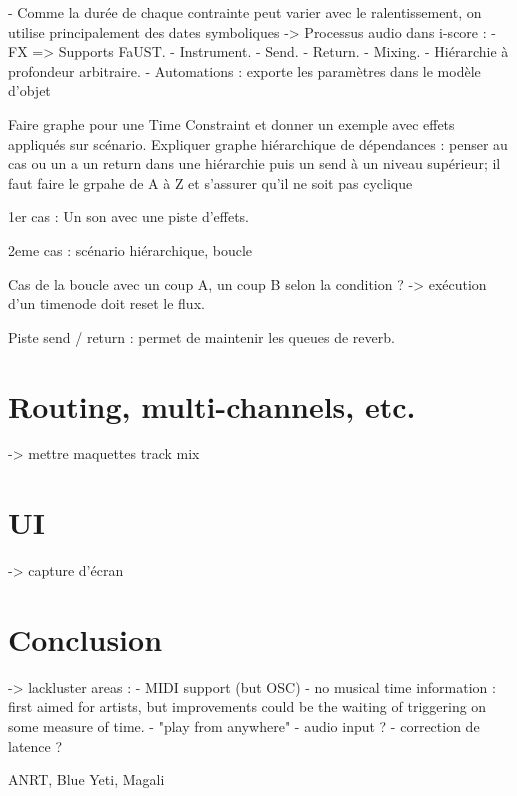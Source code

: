 \documentclass{article}
\begin{document}
- Comme la durée de chaque contrainte peut varier avec le ralentissement, on utilise principalement 
des dates symboliques
-> Processus audio dans i-score : 
- FX => Supports FaUST.
- Instrument.
- Send.
- Return.
- Mixing.
- Hiérarchie à profondeur arbitraire.
- Automations : exporte les paramètres dans le modèle d'objet

Faire graphe pour une Time Constraint et donner un exemple avec effets appliqués sur scénario.
Expliquer graphe hiérarchique de dépendances : penser au cas ou un a un return dans une hiérarchie puis un send à un niveau supérieur; il faut faire le grpahe de A à Z et s'assurer qu'il ne soit pas cyclique

1er cas : 
Un son avec une piste d'effets.

2eme cas : scénario hiérarchique, boucle

Cas de la boucle avec un coup A, un coup B selon la condition ? 
-> exécution d'un timenode doit reset le flux.

Piste send / return : permet de maintenir les queues de reverb.

\section{Routing, multi-channels, etc.}
-> mettre maquettes track mix

\section{UI}
-> capture d'écran

\section{Conclusion}
-> lackluster areas : 
- MIDI support (but OSC)
- no musical time information : first aimed for artists, 
but improvements could be the waiting of triggering on some measure of time.
- "play from anywhere"
- audio input ?
- correction de latence ?
\begin{acknowledgments}
    ANRT, Blue Yeti, Magali
\end{acknowledgments} 


\end{document}

